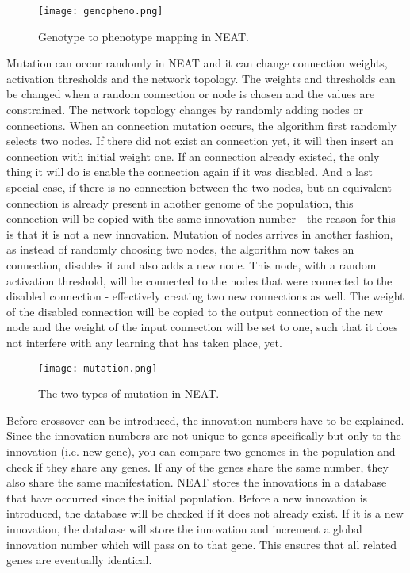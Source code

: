 \begin{figure}[H]
\centering
\texttt{[image: genopheno.png]}
\caption{Genotype to phenotype mapping in NEAT.}
\label{fig:gen}
\end{figure}

Mutation can occur randomly in NEAT and it can change connection weights, activation thresholds and the network topology.
The weights and thresholds can be changed when a random connection or node is chosen and the values are constrained.
The network topology changes by randomly adding nodes or connections.
When an connection mutation occurs, the algorithm first randomly selects two nodes.
If there did not exist an connection yet, it will then insert an connection with initial weight one.
If an connection already existed, the only thing it will do is enable the connection again if it was disabled.
And a last special case, if there is no connection between the two nodes, but an equivalent connection is already present in another genome of the population, this connection will be copied with the same innovation number - the reason for this is that it is not a new innovation.
Mutation of nodes arrives in another fashion, as instead of randomly choosing two nodes, the algorithm now takes an connection, disables it and also adds a new node.
This node, with a random activation threshold, will be connected to the nodes that were connected to the disabled connection - effectively creating two new connections as well.
The weight of the disabled connection will be copied to the output connection of the new node and the weight of the input connection will be set to one, such that it does not interfere with any learning that has taken place, yet.

\begin{figure}[H]
\centering
\texttt{[image: mutation.png]}
\caption{The two types of mutation in NEAT.}
\label{fig:mut}
\end{figure}

Before crossover can be introduced, the innovation numbers have to be explained.
Since the innovation numbers are not unique to genes specifically but only to the innovation (i.e. new gene), you can compare two genomes in the population and check if they share any genes.
If any of the genes share the same number, they also share the same manifestation. 
NEAT stores the innovations in a database that have occurred since the initial population.
Before a new innovation is introduced, the database will be checked if it does not already exist.
If it is a new innovation, the database will store the innovation and increment a global innovation number which will pass on to that gene.
This ensures that all related genes are eventually identical.

